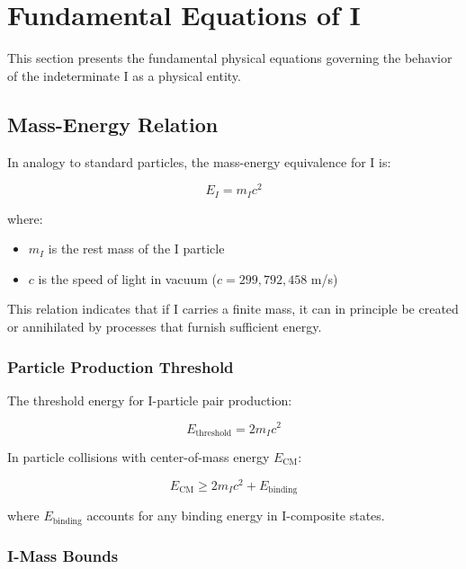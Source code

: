 \section{Fundamental Equations of I}
\label{sec:fundamental_equations}

This section presents the fundamental physical equations governing the behavior of the indeterminate I as a physical entity.

\subsection{Mass-Energy Relation}
\label{subsec:mass_energy}

In analogy to standard particles, the mass-energy equivalence for I is:

\begin{equation}
\label{eq:i_mass_energy}
E_I = m_I c^2
\end{equation}

where:
\begin{itemize}
    \item $m_I$ is the rest mass of the I particle
    \item $c$ is the speed of light in vacuum ($c = 299{,}792{,}458$ m/s)
\end{itemize}

This relation indicates that if I carries a finite mass, it can in principle be created or annihilated by processes that furnish sufficient energy.

\subsubsection{Particle Production Threshold}

The threshold energy for I-particle pair production:

\begin{equation}
\label{eq:i_production_threshold}
E_{\text{threshold}} = 2m_I c^2
\end{equation}

In particle collisions with center-of-mass energy $E_{\text{CM}}$:

\begin{equation}
\label{eq:i_production_condition}
E_{\text{CM}} \geq 2m_I c^2 + E_{\text{binding}}
\end{equation}

where $E_{\text{binding}}$ accounts for any binding energy in I-composite states.

\subsubsection{I-Mass Bounds}

